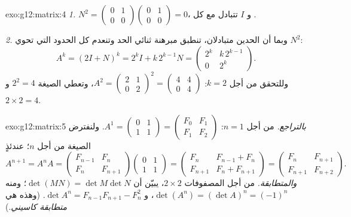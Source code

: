 \begin{solution}{exo:g12:matrix:4}
\emph{1.} $N^2 = \begin{pmatrix} 0&1\\0&0\end{pmatrix}
\begin{pmatrix} 0&1\\0&0\end{pmatrix} = 0$، و $I$ تتبادل مع كل
.

\emph{2.} وبما أن الحدين متبادلان، تنطبق مبرهنة ثنائي الحد وتنعدم كل
الحدود التي تحوي $N^2$:
\[
A^k = (2I + N)^k = 2^k I + k\,2^{k-1} N
= \begin{pmatrix} 2^k & k\,2^{k-1}\\ 0 & 2^k \end{pmatrix}.
\]
وللتحقق من أجل $k = 2$:
$A^2 = \begin{pmatrix} 2&1\\0&2\end{pmatrix}^2
= \begin{pmatrix} 4&4\\0&4\end{pmatrix}$، وتعطي الصيغة
$2^2 = 4$ و $2 \times 2 = 4$. \checkmark
\end{solution}

\begin{solution}{exo:g12:matrix:5}
\emph{بالتراجع.} من أجل $n = 1$:
$A^1 = \begin{pmatrix} 0&1\\1&1\end{pmatrix}
= \begin{pmatrix} F_0 & F_1\\ F_1 & F_2\end{pmatrix}$. ولنفترض الصيغة
من أجل $n$؛ عندئذٍ
\[
A^{n+1} = A^n A
= \begin{pmatrix} F_{n-1} & F_n\\ F_n & F_{n+1}\end{pmatrix}
\begin{pmatrix} 0 & 1\\ 1 & 1\end{pmatrix}
= \begin{pmatrix} F_n & F_{n-1} + F_n\\ F_{n+1} & F_n + F_{n+1}\end{pmatrix}
= \begin{pmatrix} F_n & F_{n+1}\\ F_{n+1} & F_{n+2}\end{pmatrix}.
\]
\emph{والمتطابقة.} من أجل المصفوفات $2\times2$، يبيّن  أن
$\det(MN) = \det M \det N$؛ ومنه
$\det(A^n) = (\det A)^n = (-1)^n$، و
$\det A^n = F_{n-1}F_{n+1} - F_n^2$. (وهذه هي \emph{متطابقة كاسيني}.)
\end{solution}

